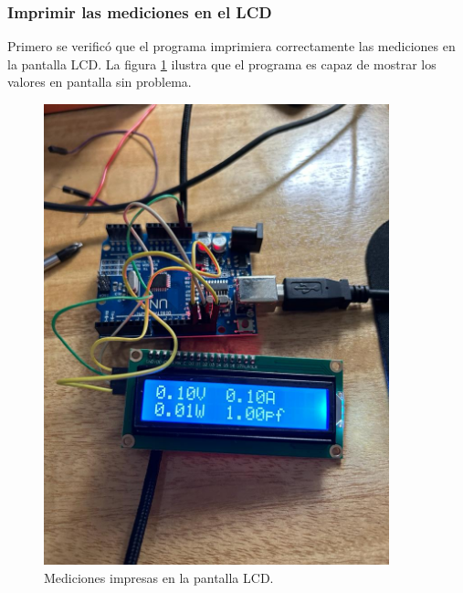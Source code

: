 \subsubsection{Imprimir las mediciones en el LCD}
Primero se verificó que el programa imprimiera correctamente las mediciones en la pantalla LCD. La figura \ref{imprimir} ilustra que el programa es capaz de mostrar los valores en pantalla sin problema.
\begin{figure}[h]
    \centering
    \includegraphics[width=10cm]{Imagenes/Medicion_Pantalla.jpg}
    \caption{Mediciones impresas en la pantalla LCD.}
    \label{imprimir}
\end{figure}
\FloatBarrier

